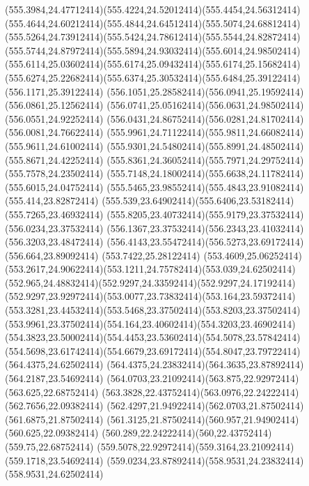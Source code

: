 {{	\curveto(555.3984,24.47712414)(555.4224,24.52012414)(555.4454,24.56312414)
	\curveto(555.4644,24.60212414)(555.4844,24.64512414)(555.5074,24.68812414)
	\curveto(555.5264,24.73912414)(555.5424,24.78612414)(555.5544,24.82872414)
	\curveto(555.5744,24.87972414)(555.5894,24.93032414)(555.6014,24.98502414)
	\curveto(555.6114,25.03602414)(555.6174,25.09432414)(555.6174,25.15682414)
	\curveto(555.6274,25.22682414)(555.6374,25.30532414)(555.6484,25.39122414)
	\lineto(556.1171,25.39122414)
	\curveto(556.1051,25.28582414)(556.0941,25.19592414)(556.0861,25.12562414)
	\curveto(556.0741,25.05162414)(556.0631,24.98502414)(556.0551,24.92252414)
	\curveto(556.0431,24.86752414)(556.0281,24.81702414)(556.0081,24.76622414)
	\curveto(555.9961,24.71122414)(555.9811,24.66082414)(555.9611,24.61002414)
	\curveto(555.9301,24.54802414)(555.8991,24.48502414)(555.8671,24.42252414)
	\curveto(555.8361,24.36052414)(555.7971,24.29752414)(555.7578,24.23502414)
	\curveto(555.7148,24.18002414)(555.6638,24.11782414)(555.6015,24.04752414)
	\curveto(555.5465,23.98552414)(555.4843,23.91082414)(555.414,23.82872414)
	\curveto(555.539,23.64902414)(555.6406,23.53182414)(555.7265,23.46932414)
	\curveto(555.8205,23.40732414)(555.9179,23.37532414)(556.0234,23.37532414)
	\curveto(556.1367,23.37532414)(556.2343,23.41032414)(556.3203,23.48472414)
	\curveto(556.4143,23.55472414)(556.5273,23.69172414)(556.664,23.89092414)
	\closepath
	\moveto(553.7422,25.28122414)
	\lineto(553.4609,25.06252414)
	\curveto(553.2617,24.90622414)(553.1211,24.75782414)(553.039,24.62502414)
	\curveto(552.965,24.48832414)(552.9297,24.33592414)(552.9297,24.17192414)
	\curveto(552.9297,23.92972414)(553.0077,23.73832414)(553.164,23.59372414)
	\curveto(553.3281,23.44532414)(553.5468,23.37502414)(553.8203,23.37502414)
	\curveto(553.9961,23.37502414)(554.164,23.40602414)(554.3203,23.46902414)
	\curveto(554.3823,23.50002414)(554.4453,23.53602414)(554.5078,23.57842414)
	\curveto(554.5698,23.61742414)(554.6679,23.69172414)(554.8047,23.79722414)
	\closepath
	\moveto(564.4375,24.62502414)
	\curveto(564.4375,24.23832414)(564.3635,23.87892414)(564.2187,23.54692414)
	\curveto(564.0703,23.21092414)(563.875,22.92972414)(563.625,22.68752414)
	\curveto(563.3828,22.43752414)(563.0976,22.24222414)(562.7656,22.09382414)
	\curveto(562.4297,21.94922414)(562.0703,21.87502414)(561.6875,21.87502414)
	\curveto(561.3125,21.87502414)(560.957,21.94902414)(560.625,22.09382414)
	\curveto(560.289,22.24222414)(560,22.43752414)(559.75,22.68752414)
	\curveto(559.5078,22.92972414)(559.3164,23.21092414)(559.1718,23.54692414)
	\curveto(559.0234,23.87892414)(558.9531,24.23832414)(558.9531,24.62502414)
}}
